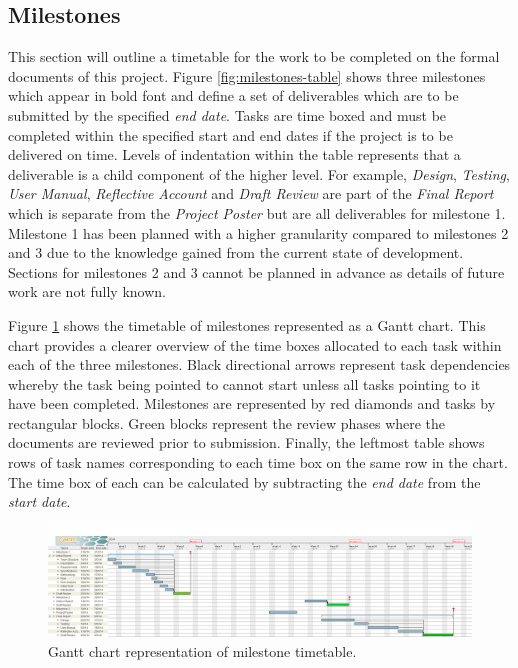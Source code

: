\documentclass[11pt,a4paper]{article}
\begin{document}
\subsection{Milestones}
\label{sec:plan-milestones}

This section will outline a timetable for the work to be completed on the formal documents of this project. Figure \ref{fig:milestones-table} shows three milestones which appear in bold font and define a set of deliverables which are to be submitted by the specified \emph{end date}. Tasks are time boxed and must be completed within the specified start and end dates if the project is to be delivered on time. Levels of indentation within the table represents that a deliverable is a child component of the higher level. For example, \emph{Design}, \emph{Testing}, \emph{User Manual}, \emph{Reflective Account} and \emph{Draft Review} are part of the \emph{Final Report} which is separate from the \emph{Project Poster} but are all deliverables for milestone 1. Milestone 1 has been planned with a higher granularity compared to milestones 2 and 3 due to the knowledge gained from the current state of development. Sections for milestones 2 and 3 cannot be planned in advance as details of future work are not fully known.

Figure \ref{fig:GanttChart} shows the timetable of milestones represented as a Gantt chart. This chart provides a clearer overview of the time boxes allocated to each task within each of the three milestones. Black directional arrows represent task dependencies whereby the task being pointed to cannot start unless all tasks pointing to it have been completed. Milestones are represented by red diamonds and tasks by rectangular blocks. Green blocks represent the review phases where the documents are reviewed prior to submission. Finally, the leftmost table shows rows of task names corresponding to each time box on the same row in the chart. The time box of each can be calculated by subtracting the \emph{end date} from the \emph{start date}.

\begin{figure}[h!]
\centering
\includegraphics[angle=90,width=0.37\linewidth]{./img/GanttChart}
\caption{Gantt chart representation of milestone timetable.}
\label{fig:GanttChart}
\end{figure}
\end{document}
